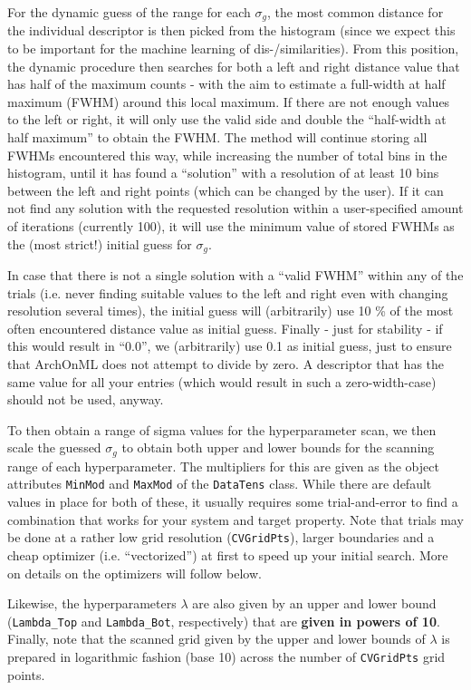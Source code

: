 \documentclass[12pt]{achemso}
\begin{document}
\noindent For the dynamic guess of the range for each $\sigma_g$, the most common distance for the individual descriptor is then picked from the histogram (since we expect this to be important for the machine learning of dis-/similarities). From this position, the dynamic procedure then searches for both a left and right distance value that has half of the maximum counts - with the aim to estimate a full-width at half maximum (FWHM) around this local maximum. If there are not enough values to the left or right, it will only use the valid side and double the ``half-width at half maximum'' to obtain the FWHM. The method will continue storing all FWHMs encountered this way, while increasing the number of total bins in the histogram, until it has found a ``solution'' with a resolution of at least 10 bins between the left and right points (which can be changed by the user).
If it can not find any solution with the requested resolution within a user-specified amount of iterations (currently 100), it will use the minimum value of stored FWHMs as the (most strict!) initial guess for $\sigma_g$. 

\noindent In case that there is not a single solution with a ``valid FWHM'' within any of the trials (i.e. never finding suitable values to the left and right even with changing resolution several times), the initial guess will (arbitrarily) use 10 \% of the most often encountered distance value as initial guess. Finally - just for stability - if this would result in ``0.0'', we (arbitrarily) use 0.1 as initial guess, just to ensure that ArchOnML does not attempt to divide by zero. A descriptor that has the same value for all your entries (which would result in such a zero-width-case) should not be used, anyway.

\noindent To then obtain a range of sigma values for the hyperparameter scan, we then scale the guessed $\sigma_g$ to obtain both upper and lower bounds for the scanning range of each hyperparameter. The multipliers for this are given as the object attributes \texttt{MinMod} and \texttt{MaxMod} of the \texttt{DataTens} class. While there are default values in place for both of these, it usually requires some trial-and-error to find a combination that works for your system and target property. Note that trials may be done at a rather low grid resolution (\texttt{CVGridPts}), larger boundaries and a cheap optimizer (i.e. ``vectorized'') at first to speed up your initial search. More on details on the optimizers will follow below.

\noindent Likewise, the hyperparameters $\lambda$ are also given by an upper and lower bound (\texttt{Lambda\_Top} and \texttt{Lambda\_Bot}, respectively) that are \textbf{given in powers of 10}. Finally, note that the scanned grid given by the upper and lower bounds of $\lambda$ is prepared in logarithmic fashion (base 10) across the number of \texttt{CVGridPts} grid points.
\end{document}
